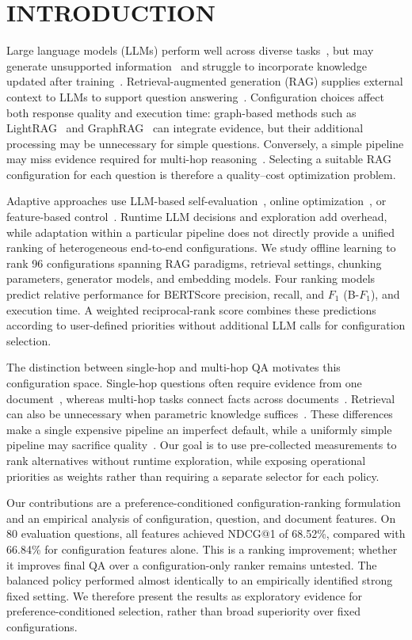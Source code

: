 \section{\uppercase{Introduction}} \label{sec1}
Large language models (LLMs) perform well across diverse tasks~\cite{Zhao25}, but may generate unsupported information~\cite{Ji23} and struggle to incorporate knowledge updated after training~\cite{Wang25}. Retrieval-augmented generation (RAG) supplies external context to LLMs to support question answering~\cite{Lewis20}. Configuration choices affect both response quality and execution time: graph-based methods such as LightRAG~\cite{Guo25} and GraphRAG~\cite{edge25} can integrate evidence, but their additional processing may be unnecessary for simple questions. Conversely, a simple pipeline may miss evidence required for multi-hop reasoning~\cite{Jeong24}. Selecting a suitable RAG configuration for each question is therefore a quality--cost optimization problem.

Adaptive approaches use LLM-based self-evaluation~\cite{Asai23}, online optimization~\cite{fu24,Tang25}, or feature-based control~\cite{Rishi25,zhang2025adagcrag}. Runtime LLM decisions and exploration add overhead, while adaptation within a particular pipeline does not directly provide a unified ranking of heterogeneous end-to-end configurations. We study offline learning to rank 96 configurations spanning RAG paradigms, retrieval settings, chunking parameters, generator models, and embedding models. Four ranking models predict relative performance for BERTScore precision, recall, and $F_1$ (B-$F_1$), and execution time. A weighted reciprocal-rank score combines these predictions according to user-defined priorities without additional LLM calls for configuration selection.

The distinction between single-hop and multi-hop QA motivates this configuration space. Single-hop questions often require evidence from one document~\cite{rajpurkar16,Shi24}, whereas multi-hop tasks connect facts across documents~\cite{yang18,ho20,trivedi22}. Retrieval can also be unnecessary when parametric knowledge suffices~\cite{Mallen23}. These differences make a single expensive pipeline an imperfect default, while a uniformly simple pipeline may sacrifice quality~\cite{LingjiaoChen24}. Our goal is to use pre-collected measurements to rank alternatives without runtime exploration, while exposing operational priorities as weights rather than requiring a separate selector for each policy.

Our contributions are a preference-conditioned configuration-ranking formulation and an empirical analysis of configuration, question, and document features. On 80 evaluation questions, all features achieved NDCG@1 of 68.52\%, compared with 66.84\% for configuration features alone. This is a ranking improvement; whether it improves final QA over a configuration-only ranker remains untested. The balanced policy performed almost identically to an empirically identified strong fixed setting. We therefore present the results as exploratory evidence for preference-conditioned selection, rather than broad superiority over fixed configurations.
